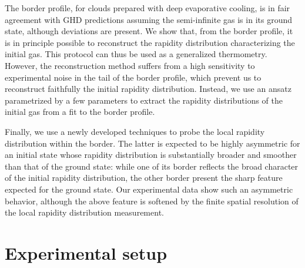 \documentclass[submission, Phys]{SciPost}
\begin{document}
The border profile, for clouds prepared with deep evaporative cooling, is in fair agreement with GHD predictions assuming the semi-infinite gas is in its ground state, although deviations are present. We show that, from the border profile, it is in principle possible to reconstruct the rapidity distribution characterizing the initial gas. This protocol can thus be used as a generalized thermometry. 
However, the reconstruction method suffers from a high sensitivity to experimental noise in the tail of the border profile, which prevent us to reconstruct faithfully the initial rapidity distribution. Instead, we use an ansatz parametrized by a few parameters to extract the rapidity distributions of the initial gas from a fit to the border profile. 

Finally, we use a newly developed techniques\cite{dubois_probing_2024} to probe the local rapidity distribution within the border. The latter is expected to be highly asymmetric for an initial state whose rapidity distribution is substantially broader and 
smoother than that of the ground state:  while one of its border 
reflects the broad character of the initial rapidity distribution, the other border 
present the sharp feature expected for the ground state.  Our experimental data show such an asymmetric behavior, although the above feature is softened by the finite spatial resolution of the local rapidity distribution measurement.  




\section{Experimental setup}
\end{document}
